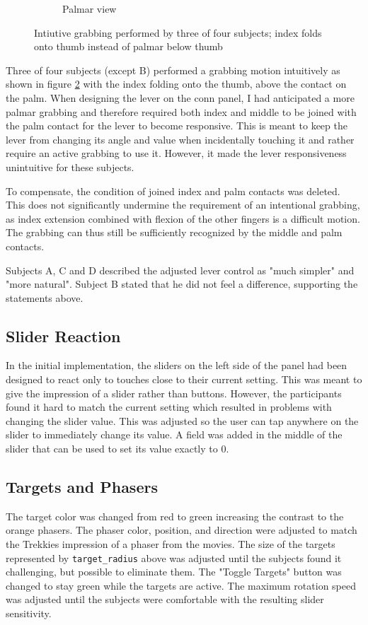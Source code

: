\documentclass[hyperref, bachelorofscience]{cgvpub}
\begin{document}
\begin{figure}
\begin{subfigure}{.45\linewidth}
		\caption{Palmar view}
		\label{fig:grab:palmar}
	\end{subfigure}
	\caption{Intiutive grabbing performed by three of four subjects; index folds onto thumb instead of palmar below thumb}
	\label{fig:grab}
\end{figure}

Three of four subjects (except B) performed a grabbing motion intuitively as shown in figure \ref{fig:grab} with the index folding onto the thumb, above the contact on the palm. When designing the lever on the conn panel, I had anticipated a more palmar grabbing and therefore required both index and middle to be joined with the palm contact for the lever to become responsive. This is meant to keep the lever from changing its angle and value when incidentally touching it and rather require an active grabbing to use it. However, it made the lever responsiveness unintuitive for these subjects.

To compensate, the condition of joined index and palm contacts was deleted. This does not significantly undermine the requirement of an intentional grabbing, as index extension combined with flexion of the other fingers is a difficult motion. The grabbing can thus still be sufficiently recognized by the middle and palm contacts. 

Subjects A, C and D described the adjusted lever control as "much simpler" and "more natural". Subject B stated that he did not feel a difference, supporting the statements above.

\subsection{Slider Reaction}
In the initial implementation, the sliders on the left side of the panel had been designed to react only to touches close to their current setting. This was meant to give the impression of a slider rather than buttons. However, the participants found it hard to match the current setting which resulted in problems with changing the slider value. This was adjusted so the user can tap anywhere on the slider to immediately change its value. A field was added in the middle of the slider that can be used to set its value exactly to $ 0 $. 

\subsection{Targets and Phasers}
The target color was changed from red to green increasing the contrast to the orange phasers. The phaser color, position, and direction were adjusted to match the Trekkies impression of a phaser from the movies. The size of the targets represented by \lstinline|target_radius| above was adjusted until the subjects found it challenging, but possible to eliminate them. The "Toggle Targets" button was changed to stay green while the targets are active. The maximum rotation speed was adjusted until the subjects were comfortable with the resulting slider sensitivity.
\end{document}
